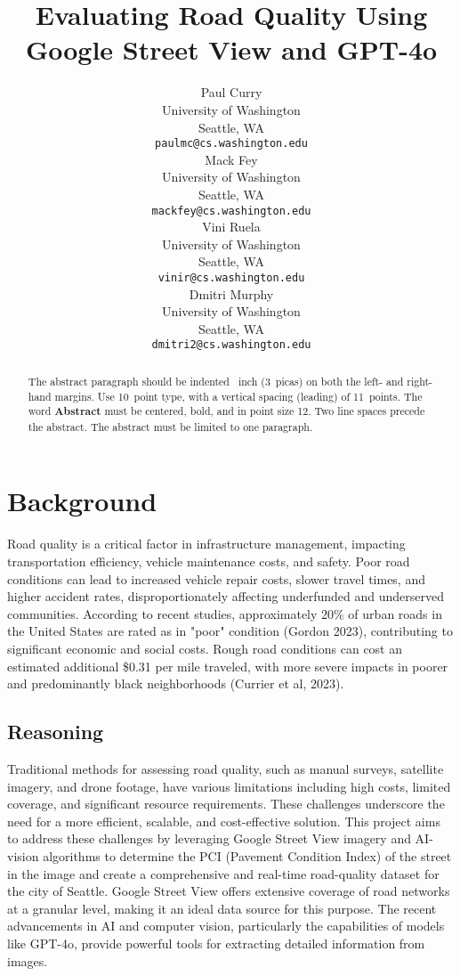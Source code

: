 \documentclass{article}
\title{Evaluating Road Quality Using Google Street View and GPT-4o}
\author{
  Paul Curry \\
  University of Washington \\
  Seattle, WA \\
  \texttt{paulmc@cs.washington.edu} \\
  \And
  Mack Fey \\
  University of Washington \\
  Seattle, WA \\
  \texttt{mackfey@cs.washington.edu} \\
  \And
  Vini Ruela \\
  University of Washington \\
  Seattle, WA \\
  \texttt{vinir@cs.washington.edu} \\
  \And
  Dmitri Murphy \\
  University of Washington \\
  Seattle, WA \\
  \texttt{dmitri2@cs.washington.edu} \\
}
\begin{document}
\maketitle


\begin{abstract}
  The abstract paragraph should be indented ~inch (3~picas) on
  both the left- and right-hand margins. Use 10~point type, with a vertical
  spacing (leading) of 11~points.  The word \textbf{Abstract} must be centered,
  bold, and in point size 12. Two line spaces precede the abstract. The abstract
  must be limited to one paragraph.
\end{abstract}


\section{Background}

Road quality is a critical factor in infrastructure management, impacting transportation efficiency, vehicle maintenance costs, and safety. Poor road conditions can lead to increased vehicle repair costs, slower travel times, and higher accident rates, disproportionately affecting underfunded and underserved communities. According to recent studies, approximately 20\% of urban roads in the United States are rated as in "poor" condition (Gordon 2023), contributing to significant economic and social costs. Rough road conditions can cost an estimated additional \$0.31 per mile traveled, with more severe impacts in poorer and predominantly black neighborhoods (Currier et al, 2023).

\subsection{Reasoning}
Traditional methods for assessing road quality, such as manual surveys, satellite imagery, and drone footage, have various limitations including high costs, limited coverage, and significant resource requirements. These challenges underscore the need for a more efficient, scalable, and cost-effective solution.
This project aims to address these challenges by leveraging Google Street View imagery and AI-vision algorithms to determine the PCI (Pavement Condition Index) of the street in the image and create a comprehensive and real-time road-quality dataset for the city of Seattle. Google Street View offers extensive coverage of road networks at a granular level, making it an ideal data source for this purpose. The recent advancements in AI and computer vision, particularly the capabilities of models like GPT-4o, provide powerful tools for extracting detailed information from images.
\end{document}
